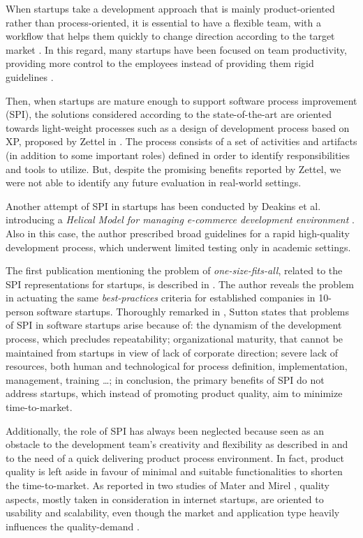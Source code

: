 \documentclass[final,5p,times,twocolumn]{elsarticle}
\begin{document}
When startups take a development approach that is mainly product-oriented rather than process-oriented, it is essential to have a flexible team, with a workflow that helps them quickly to change direction according to the target market \cite{Sutton2000}. In this regard, many startups have been focused on team productivity, providing more control to the employees instead of providing them rigid guidelines \cite{Tanabian2005, Chorev2006, Kakati2003}.

Then, when startups are mature enough to support software process improvement (SPI), the solutions considered according to the state-of-the-art are oriented towards light-weight processes such as a design of development process based on XP, proposed by Zettel in \cite{Zettel2001}. The process consists of a set of activities and artifacts (in addition to some important roles) defined in order to identify responsibilities and tools to utilize. But, despite the promising benefits reported by Zettel, we were not able to identify any future evaluation in real-world settings.

Another attempt of SPI in startups has been conducted by Deakins et al. introducing a \textit{Helical Model for managing e-commerce development environment} \cite{Deakins2005}. Also in this case, the author prescribed broad guidelines for a rapid high-quality development process, which underwent limited testing only in academic settings.

The first publication mentioning the problem of \textit{one-size-fits-all}, related to the SPI  representations for startups, is described in \cite{Fayad1997}. The author reveals the problem in actuating the same \textit{best-practices} criteria for established companies in 10-person software startups. Thoroughly remarked in \cite{Sutton2000}, Sutton states that problems of SPI in software startups arise because of: the dynamism of the development process, which precludes repeatability; organizational maturity, that cannot be maintained from startups in view of lack of corporate direction; severe lack of resources, both human and technological for process definition, implementation, management, training \ldots; in conclusion, the primary benefits of SPI do not address startups, which instead of promoting product quality, aim to minimize time-to-market.

Additionally, the role of SPI has always been neglected because seen as an obstacle to the development team’s creativity and flexibility as described in \cite{Coleman2008a} and to the need of a quick delivering product process environment. In fact, product quality is left aside in favour of minimal and suitable functionalities to shorten the time-to-market. As reported in two studies of Mater and Mirel \cite{Mater2000, Mirel2000}, quality aspects, mostly taken in consideration in internet startups, are oriented to usability and scalability, even though the market and application type heavily influences the quality-demand \cite{Coleman2008, Kim2005}.
\end{document}
